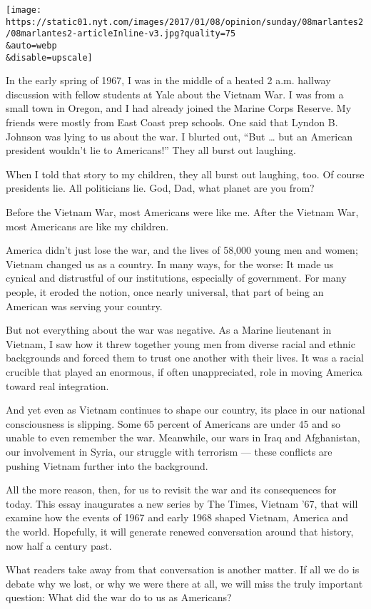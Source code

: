 \texttt{[image: https://static01.nyt.com/images/2017/01/08/opinion/sunday/08marlantes2/08marlantes2-articleInline-v3.jpg?quality=75\\\&auto=webp\\\&disable=upscale]}

In the early spring of 1967, I was in the middle of a heated 2 a.m.
hallway discussion with fellow students at Yale about the Vietnam War. I
was from a small town in Oregon, and I had already joined the Marine
Corps Reserve. My friends were mostly from East Coast prep schools. One
said that Lyndon B. Johnson was lying to us about the war. I blurted
out, ``But \ldots{} but an American president wouldn't lie to
Americans!'' They all burst out laughing.

When I told that story to my children, they all burst out laughing, too.
Of course presidents lie. All politicians lie. God, Dad, what planet are
you from?

Before the Vietnam War, most Americans were like me. After the Vietnam
War, most Americans are like my children.

America didn't just lose the war, and the lives of 58,000 young men and
women; Vietnam changed us as a country. In many ways, for the worse: It
made us cynical and distrustful of our institutions, especially of
government. For many people, it eroded the notion, once nearly
universal, that part of being an American was serving your country.

But not everything about the war was negative. As a Marine lieutenant in
Vietnam, I saw how it threw together young men from diverse racial and
ethnic backgrounds and forced them to trust one another with their
lives. It was a racial crucible that played an enormous, if often
unappreciated, role in moving America toward real integration.

And yet even as Vietnam continues to shape our country, its place in our
national consciousness is slipping. Some 65 percent of Americans are
under 45 and so unable to even remember the war. Meanwhile, our wars in
Iraq and Afghanistan, our involvement in Syria, our struggle with
terrorism --- these conflicts are pushing Vietnam further into the
background.

All the more reason, then, for us to revisit the war and its
consequences for today. This essay inaugurates a new series by The
Times, Vietnam '67, that will examine how the events of 1967 and early
1968 shaped Vietnam, America and the world. Hopefully, it will generate
renewed conversation around that history, now half a century past.

What readers take away from that conversation is another matter. If all
we do is debate why we lost, or why we were there at all, we will miss
the truly important question: What did the war do to us as Americans?

